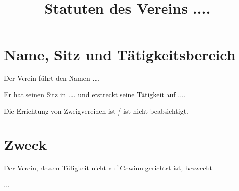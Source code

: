 \documentclass{article}
\title{Statuten des Vereins ....}
\begin{document}
\maketitle

\section{Name, Sitz und Tätigkeitsbereich}

\begin{absatz}
    \item Der Verein  führt den Namen ....
    \item Er hat seinen Sitz in .... und erstreckt seine Tätigkeit auf ....
    \item Die Errichtung von Zweigvereinen ist / ist nicht beabsichtigt.
\end{absatz}



\section{Zweck}
Der Verein, dessen Tätigkeit nicht auf Gewinn gerichtet ist, bezweckt
\begin{absatz}
    \item ...
\end{absatz}
\end{document}
